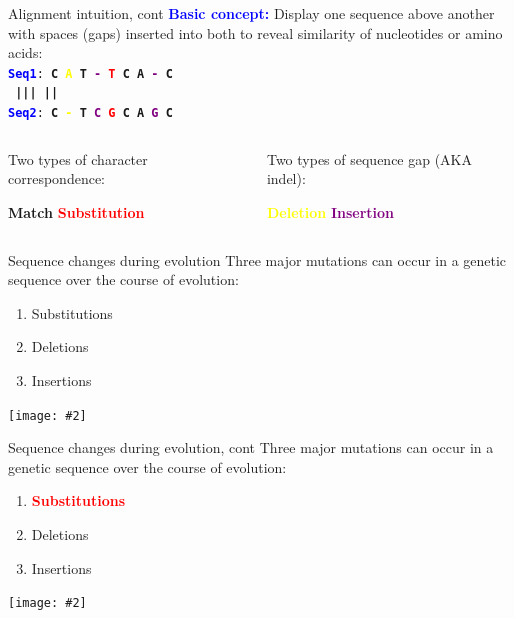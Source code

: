 \documentclass{beamer}
\renewcommand{\c}[1]{\begin{center}#1\end{center}}
\newcommand{\blu}[1]{\textcolor{blue}{\textbf{#1}}}
\newcommand{\red}[1]{\textcolor{red}{\textbf{#1}}}
\newcommand{\yel}[1]{\textcolor{yellow}{\textbf{#1}}}
\newcommand{\grn}[1]{\textcolor{dark-green}{\textbf{#1}}}
\newcommand{\prp}[1]{\textcolor{purple}{\textbf{#1}}}
\newcommand{\gr}[2][.95]{\c{\texttt{[image: \#2]}}}
\begin{document}
\begin{frame}{Alignment intuition, cont}
\blu{Basic concept:} Display one sequence above another with spaces (gaps) inserted into both to reveal similarity of nucleotides or amino acids:\\
\bigskip \noindent
\texttt{\blu{Seq1}: \grn{C} \yel{A} \grn{T} \prp{-} \red{T} \grn{C A} \prp{-} \grn{C}\\
\grn{\hspace{3em} |\hspace{1.5em}|\hspace{2.5em}| |\hspace{1.5em}|}\\
\blu{Seq2}: \grn{C} \yel{-} \grn{T} \prp{C} \red{G} \grn{C A} \prp{G} \grn{C}
}\\
\bigskip
\begin{columns}
    \begin{column}{0.5\textwidth}
        Two types of character correspondence:\\
        \begin{outline}
            \1 \grn{Match}
            \1 \red{Substitution}
        \end{outline}
    \end{column}
    \begin{column}{0.5\textwidth}
    Two types of sequence gap (AKA indel):
    \begin{outline}
        \1 \yel{Deletion}
        \1 \prp{Insertion}
    \end{outline}
    \end{column}
\end{columns}
\end{frame}

\begin{frame}{Sequence changes during evolution}
Three major mutations can occur in a genetic sequence over the course of evolution:
\begin{enumerate}
    \item Substitutions
    \item Deletions
    \item Insertions
\end{enumerate}
\gr{l3_figs/s8_tree.png}
\end{frame}

\begin{frame}{Sequence changes during evolution, cont}
Three major mutations can occur in a genetic sequence over the course of evolution:
\begin{enumerate}
    \item \red{Substitutions}
    \item Deletions
    \item Insertions
\end{enumerate}
\gr{l3_figs/s9_tree.png}
\end{frame}
\end{document}
